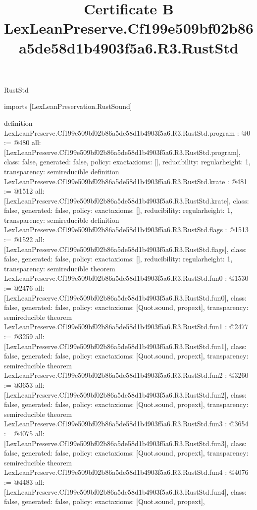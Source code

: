 \begin{lexlean}{RustStd}
\title{Certificate B LexLeanPreserve.Cf199e509bf02b86a5de58d1b4903f5a6.R3.RustStd}
\begin{coremodule}
imports [LexLeanPreservation.RustSound]

definition LexLeanPreserve.Cf199e509bf02b86a5de58d1b4903f5a6.R3.RustStd.program : @0 := @480 {
  all: [LexLeanPreserve.Cf199e509bf02b86a5de58d1b4903f5a6.R3.RustStd.program],
  class: false,
  generated: false,
  policy: exact{axioms: []},
  reducibility: regular{height: 1},
  transparency: semireducible
}
definition LexLeanPreserve.Cf199e509bf02b86a5de58d1b4903f5a6.R3.RustStd.krate : @481 := @1512 {
  all: [LexLeanPreserve.Cf199e509bf02b86a5de58d1b4903f5a6.R3.RustStd.krate],
  class: false,
  generated: false,
  policy: exact{axioms: []},
  reducibility: regular{height: 1},
  transparency: semireducible
}
definition LexLeanPreserve.Cf199e509bf02b86a5de58d1b4903f5a6.R3.RustStd.flags : @1513 := @1522 {
  all: [LexLeanPreserve.Cf199e509bf02b86a5de58d1b4903f5a6.R3.RustStd.flags],
  class: false,
  generated: false,
  policy: exact{axioms: []},
  reducibility: regular{height: 1},
  transparency: semireducible
}
theorem LexLeanPreserve.Cf199e509bf02b86a5de58d1b4903f5a6.R3.RustStd.fun0 : @1530 := @2476 {
  all: [LexLeanPreserve.Cf199e509bf02b86a5de58d1b4903f5a6.R3.RustStd.fun0],
  class: false,
  generated: false,
  policy: exact{axioms: [Quot.sound, propext]},
  transparency: semireducible
}
theorem LexLeanPreserve.Cf199e509bf02b86a5de58d1b4903f5a6.R3.RustStd.fun1 : @2477 := @3259 {
  all: [LexLeanPreserve.Cf199e509bf02b86a5de58d1b4903f5a6.R3.RustStd.fun1],
  class: false,
  generated: false,
  policy: exact{axioms: [Quot.sound, propext]},
  transparency: semireducible
}
theorem LexLeanPreserve.Cf199e509bf02b86a5de58d1b4903f5a6.R3.RustStd.fun2 : @3260 := @3653 {
  all: [LexLeanPreserve.Cf199e509bf02b86a5de58d1b4903f5a6.R3.RustStd.fun2],
  class: false,
  generated: false,
  policy: exact{axioms: [Quot.sound, propext]},
  transparency: semireducible
}
theorem LexLeanPreserve.Cf199e509bf02b86a5de58d1b4903f5a6.R3.RustStd.fun3 : @3654 := @4075 {
  all: [LexLeanPreserve.Cf199e509bf02b86a5de58d1b4903f5a6.R3.RustStd.fun3],
  class: false,
  generated: false,
  policy: exact{axioms: [Quot.sound, propext]},
  transparency: semireducible
}
theorem LexLeanPreserve.Cf199e509bf02b86a5de58d1b4903f5a6.R3.RustStd.fun4 : @4076 := @4483 {
  all: [LexLeanPreserve.Cf199e509bf02b86a5de58d1b4903f5a6.R3.RustStd.fun4],
  class: false,
  generated: false,
  policy: exact{axioms: [Quot.sound, propext]},
}
\end{coremodule}
\end{lexlean}
